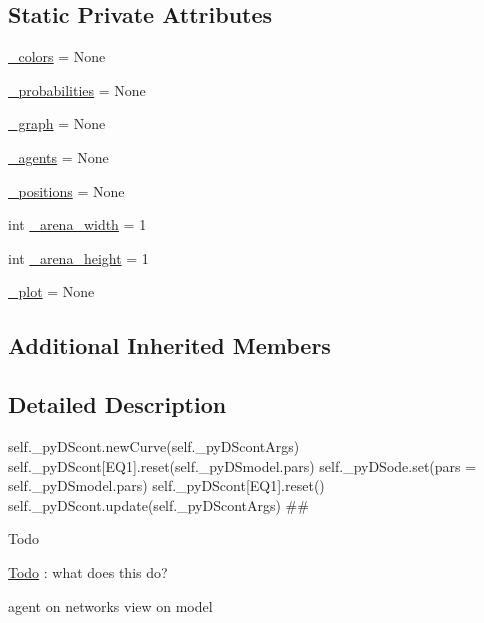 \subsection*{Static Private Attributes}
\begin{DoxyCompactItemize}
\item 
\hyperlink{class_mu_mo_t_1_1_mu_mo_tmultiagent_view_a6aaed74c935ed5380691798f75527a18}{\+\_\+colors} = None
\item 
\hyperlink{class_mu_mo_t_1_1_mu_mo_tmultiagent_view_aaf2c34c5022e4e3c872dbee11e50ea9b}{\+\_\+probabilities} = None
\item 
\hyperlink{class_mu_mo_t_1_1_mu_mo_tmultiagent_view_a752f43042d51a40fed348b434aad0fd8}{\+\_\+graph} = None
\item 
\hyperlink{class_mu_mo_t_1_1_mu_mo_tmultiagent_view_a5032de31aad9de4528138249999e7d5f}{\+\_\+agents} = None
\item 
\hyperlink{class_mu_mo_t_1_1_mu_mo_tmultiagent_view_a8be9986760a86837e04718906d18d596}{\+\_\+positions} = None
\item 
int \hyperlink{class_mu_mo_t_1_1_mu_mo_tmultiagent_view_a372c083f5428e7f8a68298ec9dcca941}{\+\_\+arena\+\_\+width} = 1
\item 
int \hyperlink{class_mu_mo_t_1_1_mu_mo_tmultiagent_view_a12711c70e125709b78f820722ba74d09}{\+\_\+arena\+\_\+height} = 1
\item 
\hyperlink{class_mu_mo_t_1_1_mu_mo_tmultiagent_view_acdfed4631d661bc2ad215c25a2ed8260}{\+\_\+plot} = None
\end{DoxyCompactItemize}
\subsection*{Additional Inherited Members}


\subsection{Detailed Description}
self.\+\_\+py\+D\+Scont.\+new\+Curve(self.\+\_\+py\+D\+Scont\+Args) self.\+\_\+py\+D\+Scont\mbox{[}\textquotesingle{}E\+Q1\textquotesingle{}\mbox{]}.reset(self.\+\_\+py\+D\+Smodel.\+pars) self.\+\_\+py\+D\+Sode.\+set(pars = self.\+\_\+py\+D\+Smodel.\+pars) self.\+\_\+py\+D\+Scont\mbox{[}\textquotesingle{}E\+Q1\textquotesingle{}\mbox{]}.reset() self.\+\_\+py\+D\+Scont.\+update(self.\+\_\+py\+D\+Scont\+Args) \#\# 

\begin{DoxyRefDesc}{Todo}
\item[\hyperlink{todo__todo000001}{Todo}]\+: what does this do? \end{DoxyRefDesc}
agent on networks view on model 

